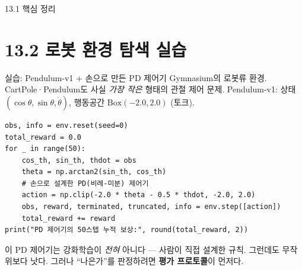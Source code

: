 \documentclass[aspectratio=169,11pt]{beamer}
\begin{document}
\begin{frame}{13.1 핵심 정리}
\end{frame}

\section{13.2 로봇 환경 탐색 실습}

\begin{frame}[fragile]{실습: Pendulum-v1 + 손으로 만든 PD 제어기}
  Gymnasium의 로봇류 환경. CartPole·Pendulum도 사실 \emph{가장 작은}
  형태의 관절 제어 문제. Pendulum-v1: 상태 $(\cos\theta, \sin\theta, \dot\theta)$,
   행동공간 $\text{Box}(-2.0, 2.0)$ (토크).
\begin{lstlisting}
obs, info = env.reset(seed=0)
total_reward = 0.0
for _ in range(50):
    cos_th, sin_th, thdot = obs
    theta = np.arctan2(sin_th, cos_th)
    # 손으로 설계한 PD(비례-미분) 제어기
    action = np.clip(-2.0 * theta - 0.5 * thdot, -2.0, 2.0)
    obs, reward, terminated, truncated, info = env.step([action])
    total_reward += reward
print("PD 제어기의 50스텝 누적 보상:", round(total_reward, 2))
\end{lstlisting}
  {\footnotesize 이 PD 제어기는 강화학습이 \emph{전혀} 아니다 --- 사람이 직접
  설계한 규칙. 그런데도 무작위보다 낫다. 그러나 ``나은가''를 판정하려면
  \textbf{평가 프로토콜}이 먼저다.}
\end{frame}
\end{document}
